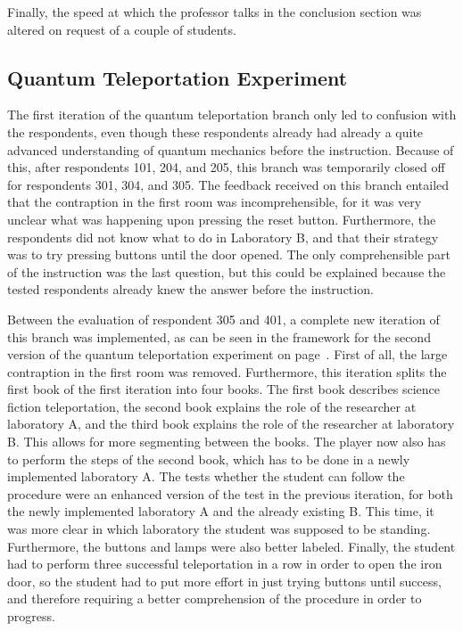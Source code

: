 \documentclass[11pt,twoside]{report} %
\begin{document}
Finally, the speed at which the professor talks in the conclusion section was altered on request of a couple of students.

\subsection{Quantum Teleportation Experiment}

The first iteration of the quantum teleportation branch only led to confusion with the respondents, even though these respondents already had already a quite advanced understanding of quantum mechanics before the instruction. Because of this, after respondents 101, 204, and 205, this branch was temporarily closed off for respondents 301, 304, and 305. The feedback received on this branch entailed that the contraption in the first room was incomprehensible, for it was very unclear what was happening upon pressing the reset button. Furthermore, the respondents did not know what to do in Laboratory B, and that their strategy was to try pressing buttons until the door opened. The only comprehensible part of the instruction was the last question, but this could be explained because the tested respondents already knew the answer before the instruction.

Between the evaluation of respondent 305 and 401, a complete new iteration of this branch was implemented, as can be seen in the framework for the second version of the quantum teleportation experiment on page~\pageref{app:teleportation2}. First of all, the large contraption in the first room was removed. Furthermore, this iteration splits the first book of the first iteration into four books. The first book describes science fiction teleportation, the second book explains the role of the researcher at laboratory A, and the third book explains the role of the researcher at laboratory B. This allows for more segmenting between the books. The player now also has to perform the steps of the second book, which has to be done in a newly implemented laboratory A. The tests whether the student can follow the procedure were an enhanced version of the test in the previous iteration, for both the newly implemented laboratory A and the already existing B. This time, it was more clear in which laboratory the student was supposed to be standing. Furthermore, the buttons and lamps were also better labeled. Finally, the student had to perform three successful teleportation in a row in order to open the iron door, so the student had to put more effort in just trying buttons until success, and therefore requiring a better comprehension of the procedure in order to progress.
\end{document}

